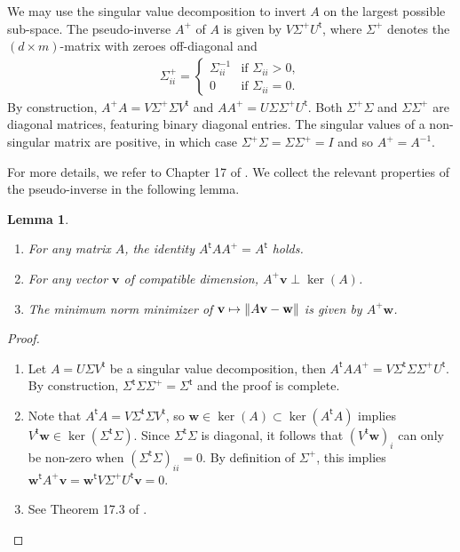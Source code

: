 \documentclass{article}
\newcommand*{\bfv}{\mathbf{v}}
\newcommand*{\bfw}{\mathbf{w}}
\newcommand*{\inv}{^{-1}}
\newcommand*{\pinv}{^{+}}
\newcommand*{\tran}{^{\mathsf{t}}}
\DeclarePairedDelimiter{\norm}{\lVert}{\rVert}
\newtheorem{lemma}{Lemma}[section]
\begin{document}
We may use the singular value decomposition to invert $A$ on the largest
possible sub-space. The pseudo-inverse $A\pinv$ of $A$ is given by $V
\Sigma\pinv U\tran$, where $\Sigma\pinv$ denotes the $(d \times m)$-matrix with
zeroes off-diagonal and \begin{align*}
  \Sigma\pinv_{ii} = \begin{cases}
    \Sigma_{ii}\inv &\mbox{if } \Sigma_{ii} > 0, \\
    0 &\mbox{if } \Sigma_{ii} = 0.
  \end{cases}
\end{align*} By construction, $A\pinv A = V \Sigma\pinv \Sigma V\tran$ and $A
A\pinv = U \Sigma \Sigma\pinv U\tran$. Both $\Sigma\pinv \Sigma$ and $\Sigma
\Sigma\pinv$ are diagonal matrices, featuring binary diagonal entries. The
singular values of a non-singular matrix are positive, in which case
$\Sigma\pinv \Sigma = \Sigma \Sigma\pinv = I$ and so $A\pinv = A\inv$.

For more details, we refer to Chapter 17 of \cite{roman_2008}. We collect the
relevant properties of the pseudo-inverse in the following lemma.

\begin{lemma}
  \begin{enumerate}
    \item For any matrix $A$, the identity $A\tran A A\pinv = A\tran$ holds.
      \label{lem::pinv_a}
    \item For any vector $\bfv$ of compatible dimension, $A\pinv \bfv \perp
      \ker(A)$. \label{lem::pinv_b}
    \item The minimum norm minimizer of $\bfv \mapsto \norm{A \bfv - \bfw}$ is
      given by $A\pinv \bfw$. \label{lem::pinv_c}
  \end{enumerate}
\end{lemma}

\begin{proof}
  \begin{enumerate}
    \item Let $A = U \Sigma V\tran$ be a singular value decomposition, then
      $A\tran A A\pinv = V \Sigma\tran \Sigma \Sigma\pinv U\tran$. By
      construction, $\Sigma\tran \Sigma \Sigma\pinv = \Sigma\tran$ and the proof
      is complete.
    \item Note that $A\tran A = V \Sigma\tran \Sigma V\tran$, so $\bfw \in
      \ker(A) \subset \ker(A\tran A)$ implies $V\tran \bfw \in \ker(\Sigma\tran
      \Sigma)$. Since $\Sigma\tran \Sigma$ is diagonal, it follows that $(V\tran
      \bfw)_i$ can only be non-zero when $(\Sigma\tran \Sigma)_{ii} = 0$. By
      definition of $\Sigma\pinv$, this implies $\bfw\tran A\pinv \bfv =
      \bfw\tran V \Sigma\pinv U\tran \bfv = 0$.
    \item See Theorem 17.3 of \cite{roman_2008}.
  \end{enumerate}
\end{proof}
\end{document}
